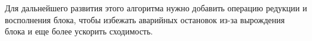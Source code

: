 \begin{algorithm}[H]
\end{algorithm}

Для дальнейшего развития этого алгоритма нужно добавить операцию редукции и восполнения
блока, чтобы избежать аварийных остановок из-за вырождения блока и еще более ускорить сходимость.  

